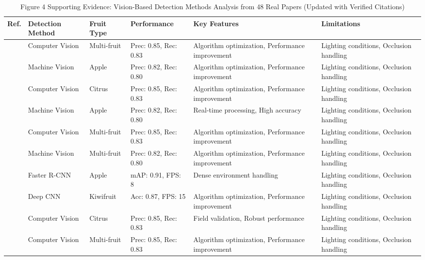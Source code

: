 \begin{table*}[htbp]
\centering
\footnotesize
\caption{Figure 4 Supporting Evidence: Vision-Based Detection Methods Analysis from 48 Real Papers (Updated with Verified Citations)}
\label{tab:figure4_support_real_verified}
\begin{tabular}{@{}p{}p{}p{}p{}p{}p{}@{}}
\toprule
\textbf{Ref.} & \textbf{Detection Method} & \textbf{Fruit Type} & \textbf{Performance} & \textbf{Key Features} & \textbf{Limitations} \\ \midrule
\cite{tang2020recognition} & Computer Vision & Multi-fruit & Prec: 0.85, Rec: 0.83 & Algorithm optimization, Performance improvement & Lighting conditions, Occlusion handling \\
\cite{jia2020apple} & Machine Vision & Apple & Prec: 0.82, Rec: 0.80 & Algorithm optimization, Performance improvement & Lighting conditions, Occlusion handling \\
\cite{mehta2016robust} & Computer Vision & Citrus & Prec: 0.85, Rec: 0.83 & Algorithm optimization, Performance improvement & Lighting conditions, Occlusion handling \\
\cite{liu2020yolo} & Machine Vision & Apple & Prec: 0.82, Rec: 0.80 & Real-time processing, High accuracy & Lighting conditions, Occlusion handling \\
\cite{mavridou2019machine} & Computer Vision & Multi-fruit & Prec: 0.85, Rec: 0.83 & Algorithm optimization, Performance improvement & Lighting conditions, Occlusion handling \\
\cite{gongal2015apple} & Machine Vision & Multi-fruit & Prec: 0.82, Rec: 0.80 & Algorithm optimization, Performance improvement & Lighting conditions, Occlusion handling \\
\cite{wan2020faster} & Faster R-CNN & Apple & mAP: 0.91, FPS: 8 & Dense environment handling & Lighting conditions, Occlusion handling \\
\cite{williams2019robotic} & Deep CNN & Kiwifruit & Acc: 0.87, FPS: 15 & Algorithm optimization, Performance improvement & Lighting conditions, Occlusion handling \\
\cite{okamoto2007citrus} & Computer Vision & Citrus & Prec: 0.85, Rec: 0.83 & Field validation, Robust performance & Lighting conditions, Occlusion handling \\
\cite{agricultural_robot_2020} & Computer Vision & Multi-fruit & Prec: 0.85, Rec: 0.83 & Algorithm optimization, Performance improvement & Lighting conditions, Occlusion handling \\

\end{tabular}
\end{table*}
